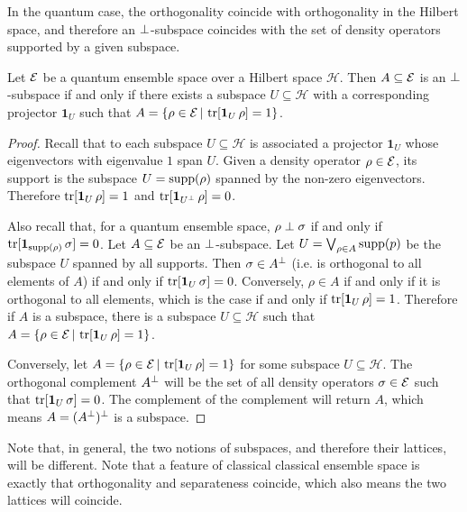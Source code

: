In the quantum case, the orthogonality coincide with orthogonality in the Hilbert space, and therefore an $\perp$-subspace coincides with the set of density operators supported by a given subspace.

\begin{prop}
	Let $\mathcal{E}$ be a quantum ensemble space over a Hilbert space $\mathcal{H}$. Then $A \subseteq \mathcal{E}$ is an $\perp$-subspace if and only if there exists a subspace $U \subseteq \mathcal{H}$ with a corresponding projector $\mathbf{1}_{U}$ such that $A = \{ \rho \in \mathcal{E} \, | \, \operatorname{tr}[\mathbf{1}_{U} \, \rho] = 1\}$. 
\end{prop}

\begin{proof}
	Recall that to each subspace $U \subseteq \mathcal{H}$ is associated a projector $\mathbf{1}_U$ whose eigenvectors with eigenvalue $1$ span $U$. Given a density operator $\rho \in \mathcal{E}$, its support is the subspace $U=\mathrm{supp}(\rho)$ spanned by the non-zero eigenvectors. Therefore $\operatorname{tr}[\mathbf{1}_{U} \, \rho] = 1$ and $\operatorname{tr}[\mathbf{1}_{U^{\perp}} \, \rho] = 0$.

	Also recall that, for a quantum ensemble space, $\rho \perp \sigma$ if and only if $\operatorname{tr}[ \mathbf{1}_{\mathrm{supp}(\rho)} \, \sigma] = 0$. Let $A \subseteq \mathcal{E}$ be an $\perp$-subspace. Let $U = \bigvee_{\rho \in A} \mathrm{supp}(p)$ be the subspace $U$ spanned by all supports. Then $\sigma \in A^{\perp}$  (i.e. is orthogonal to all elements of $A$) if and only if $\operatorname{tr}[\mathbf{1}_{U} \, \sigma] = 0$. Conversely, $\rho \in A$ if and only if it is orthogonal to all elements, which is the case if and only if $\operatorname{tr}[\mathbf{1}_{U} \, \rho] = 1$. Therefore if $A$ is a subspace, there is a subspace $U \subseteq \mathcal{H}$ such that $A = \{ \rho \in \mathcal{E} \, | \, \operatorname{tr}[\mathbf{1}_{U} \, \rho] = 1\}$.
	
	Conversely, let $A = \{ \rho \in \mathcal{E} \, | \, \operatorname{tr}[\mathbf{1}_{U} \, \rho] = 1\}$ for some subspace $U \subseteq \mathcal{H}$. The orthogonal complement $A^{\perp}$ will be the set of all density operators $\sigma \in \mathcal{E}$ such that $\operatorname{tr}[\mathbf{1}_{U} \, \sigma] = 0$. The complement of the complement will return $A$, which means $A = (A^{\perp})^{\perp}$ is a subspace.
\end{proof}

Note that, in general, the two notions of subspaces, and therefore their lattices, will be different. Note that a feature of classical classical ensemble space is exactly that orthogonality and separateness coincide, which also means the two lattices will coincide.

